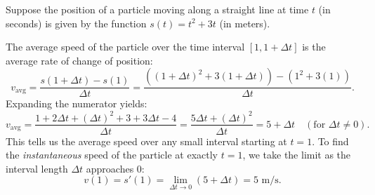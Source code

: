 \documentclass[../calculus.tex]{subfiles}
\begin{document}
\begin{center}
\end{center}

\begin{example}
    Suppose the position of a particle moving along a straight line at time $t$ (in seconds) is given by the function $s(t) = t^2 + 3t$ (in meters). 
    
    The average speed of the particle over the time interval $[1, 1+\Delta t]$ is the average rate of change of position:
    \[
      v_{\text{avg}} = \frac{s(1+\Delta t) - s(1)}{\Delta t} = \frac{\left((1+\Delta t)^2 + 3(1+\Delta t)\right) - (1^2 + 3(1))}{\Delta t}.
    \]
    Expanding the numerator yields:
    \[
      v_{\text{avg}} = \frac{1 + 2\Delta t + (\Delta t)^2 + 3 + 3\Delta t - 4}{\Delta t} = \frac{5\Delta t + (\Delta t)^2}{\Delta t} = 5 + \Delta t \quad (\text{for } \Delta t \neq 0).
    \]
    This tells us the average speed over any small interval starting at $t=1$. To find the \textit{instantaneous} speed of the particle at exactly $t = 1$, we take the limit as the interval length $\Delta t$ approaches $0$:
    \[
      v(1) = s'(1) = \lim_{\Delta t \to 0} (5 + \Delta t) = 5 \text{ m/s}.
    \]
\end{example}
  
\end{document}
